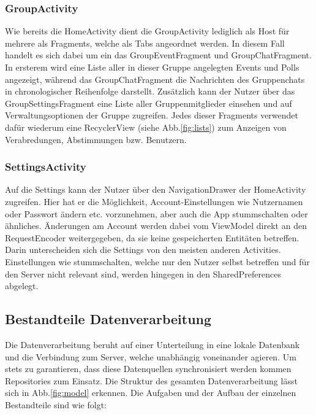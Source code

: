 \documentclass[parskip=full,11pt]{scrartcl}
\begin{document}
\subsubsection{GroupActivity}

Wie bereits die HomeActivity dient die GroupActivity lediglich als Host für 
mehrere als Fragments, welche als Tabs angeordnet werden. In diesem Fall 
handelt es sich dabei um ein das GroupEventFragment und GroupChatFragment. In 
ersterem wird eine Liste aller in dieser Gruppe angelegten Events und Polls 
angezeigt, während das GroupChatFragment die Nachrichten des Gruppenchats in 
chronologischer Reihenfolge darstellt. Zusätzlich kann der Nutzer über das 
GroupSettingsFragment eine Liste aller Gruppenmitglieder einsehen und auf 
Verwaltungsoptionen der Gruppe zugreifen. Jedes dieser Fragments verwendet 
dafür wiederum eine RecyclerView (siehe Abb.\ref{fig:lists}) zum Anzeigen von 
Verabredungen, Abstimmungen bzw. Benutzern.

\subsubsection{SettingsActivity}

Auf die Settings kann der Nutzer über den NavigationDrawer der HomeActivity
zugreifen. Hier hat er die Möglichkeit, Account-Einstellungen wie Nutzernamen
oder Passwort ändern etc. vorzunehmen, aber auch die App stummschalten oder
ähnliches. Änderungen am Account werden dabei vom ViewModel direkt an den
RequestEncoder weitergegeben, da sie keine gespeicherten Entitäten betreffen.
Darin unterscheiden sich die Settings von den meisten anderen Activities.
Einstellungen wie stummschalten, welche nur den Nutzer selbst betreffen und für
den Server nicht relevant sind, werden hingegen in den SharedPreferences
abgelegt.


\subsection{Bestandteile Datenverarbeitung}
Die Datenverarbeitung beruht auf einer Unterteilung in eine lokale Datenbank
und die Verbindung zum Server, welche unabhängig voneinander agieren. Um stets
zu garantieren, dass diese Datenquellen synchronisiert werden kommen
Repositories zum Einsatz. Die Struktur des gesamten Datenverarbeitung lässt
sich in Abb.\ref{fig:model} erkennen. Die Aufgaben und der Aufbau der einzelnen
Bestandteile sind wie folgt:
\end{document}
